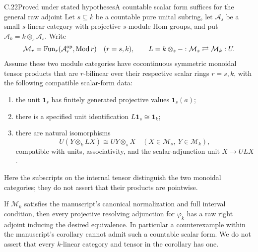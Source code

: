 \begin{claim}{C.22}{Proved under stated hypotheses}{A countable scalar form suffices for the general raw adjoint}\label{C22}
Let $s\subseteq k$ be a countable pure unital subring, let $\mathcal A_s$ be a small $s$-linear category with projective $s$-module Hom groups, and put $\mathcal A_k=k\otimes_s\mathcal A_s$. Write
\[
 \mathcal M_r=\operatorname{Fun}_{r}(\mathcal A_r^{\mathrm{op}},\operatorname{Mod} r)
 \quad(r=s,k),
 \qquad L=k\otimes_s-:\mathcal M_s\rightleftarrows\mathcal M_k:U.
\]
Assume these two module categories have cocontinuous symmetric monoidal tensor products that are $r$-bilinear over their respective scalar rings $r=s,k$, with the following compatible scalar-form data:
\begin{enumerate}
\item the unit $\mathbf1_s$ has finitely generated projective values $\mathbf1_s(a)$;
\item there is a specified unit identification $L\mathbf1_s\cong\mathbf1_k$;
\item there are natural isomorphisms
\[
 U(Y\otimes_k LX)\cong UY\otimes_sX
 \quad(X\in\mathcal M_s,\ Y\in\mathcal M_k),
\]
compatible with units, associativity, and the scalar-adjunction unit $X\to ULX$.
\end{enumerate}
Here the subscripts on the internal tensor distinguish the two monoidal categories; they do not assert that their products are pointwise.

If $\mathcal M_k$ satisfies the manuscript's canonical normalization and full interval condition, then every projective resolving adjunction for $\varphi_k$ has a raw right adjoint inducing the desired equivalence. In particular a counterexample within the manuscript's corollary cannot admit such a countable scalar form. We do not assert that every $k$-linear category and tensor in the corollary has one.
\end{claim}
